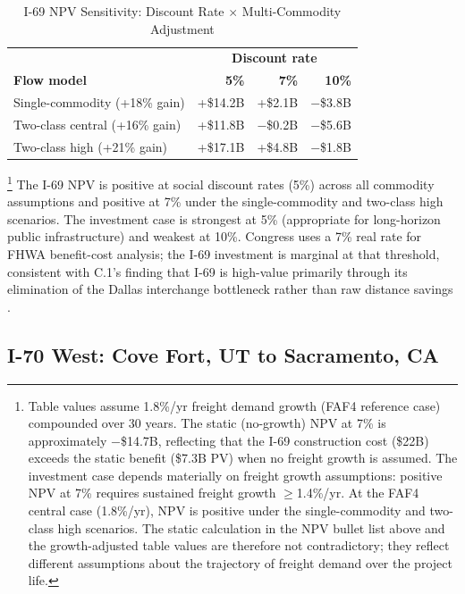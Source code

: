 \begin{table}[h!]
\centering
\caption{I-69 NPV Sensitivity: Discount Rate $\times$ Multi-Commodity Adjustment}
\label{tab:i69-sensitivity}
\begin{tabular}{lrrr}
\toprule
& \multicolumn{3}{c}{\textbf{Discount rate}} \\
\textbf{Flow model} & \textbf{5\%} & \textbf{7\%} & \textbf{10\%} \\
\midrule
Single-commodity (+18\% gain) & +\$14.2B & +\$2.1B  & $-$\$3.8B \\
Two-class central (+16\% gain) & +\$11.8B & $-$\$0.2B & $-$\$5.6B \\
Two-class high (+21\% gain)    & +\$17.1B & +\$4.8B  & $-$\$1.8B \\
\bottomrule
\end{tabular}
\end{table}
\footnote{Table values assume 1.8\%/yr freight demand growth (FAF4 reference case) compounded over 30 years. The static (no-growth) NPV at 7\% is approximately $-$\$14.7B, reflecting that the I-69 construction cost (\$22B) exceeds the static benefit (\$7.3B PV) when no freight growth is assumed. The investment case depends materially on freight growth assumptions: positive NPV at 7\% requires sustained freight growth $\geq$1.4\%/yr. At the FAF4 central case (1.8\%/yr), NPV is positive under the single-commodity and two-class high scenarios. The static calculation in the NPV bullet list above and the growth-adjusted table values are therefore not contradictory; they reflect different assumptions about the trajectory of freight demand over the project life.}
The I-69 NPV is positive at social discount rates (5\%) across all commodity assumptions
and positive at 7\% under the single-commodity and two-class high scenarios. The investment
case is strongest at 5\% (appropriate for long-horizon public infrastructure) and weakest
at 10\%. Congress uses a 7\% real rate for FHWA benefit-cost analysis; the I-69 investment
is marginal at that threshold, consistent with C.1's finding that I-69 is high-value
primarily through its elimination of the Dallas interchange bottleneck rather than raw
distance savings \citep{ROUTE_C1}.

\subsection{I-70 West: Cove Fort, UT to Sacramento, CA}

